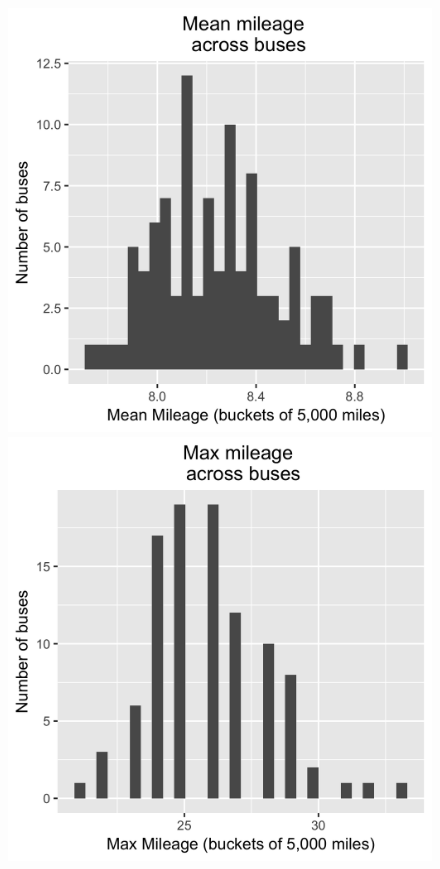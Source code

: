 \documentclass[paper=a4, fontsize=11pt]{scrartcl} %
\numberwithin{equation}{section} %
\numberwithin{figure}{section} %
\numberwithin{table}{section} %
\begin{document}
\begin{itemize}
\begin{itemize}
\begin{figure}
	\centering
	\begin{minipage}[b]{.48\linewidth}
		\includegraphics[scale=.15]{mean_mileage_plot.png}
	\end{minipage}
	\begin{minipage}[b]{.48\linewidth}
		\includegraphics[scale=.15]{max_mileage_plot.png}

\end{minipage}
\end{figure}
\end{itemize}
\end{itemize}
\end{document}
